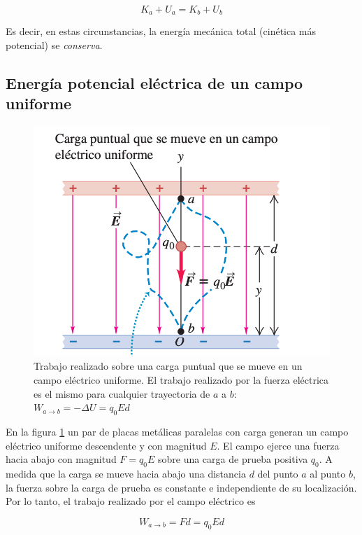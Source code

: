 \begin{equation}\label{23.3}
K_a+U_a=K_b+U_b
\end{equation}

Es decir, en estas circunstancias, la energía mecánica total (cinética más potencial) se
\textit{conserva}.

\subsection{Energía potencial eléctrica de un campo uniforme}
\begin{figure}[h]
\centering
\includegraphics[scale=0.5]{fig/energia_potencial}
\caption{Trabajo realizado sobre una carga puntual que se mueve en un campo eléctrico uniforme. El trabajo realizado por la fuerza eléctrica es el mismo para cualquier trayectoria de $a$ a $b$: $W_{a\to b}=-\Delta U=q_0Ed$} 
\label{fig:energia_potencial}
\end{figure}

En la figura \ref{fig:energia_potencial} un par de placas metálicas paralelas con carga generan un campo eléctrico uniforme descendente y con magnitud $E$. El campo ejerce una fuerza hacia abajo con magnitud $F=q_0E$ sobre una carga de prueba positiva $q_0$. A medida que la carga se mueve hacia abajo una distancia $d$ del punto $a$ al punto $b$, la fuerza sobre la carga de prueba es constante e independiente de su localización. Por lo tanto, el trabajo realizado por el campo eléctrico es 

\begin{equation}\label{23.4}
W_{a\to b}=Fd=q_0Ed
\end{equation}

